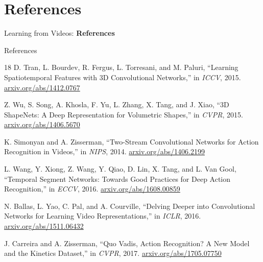 \section{References}
\begin{frame}{}
    \LARGE Learning from Videos: \textbf{References}
\end{frame}

\begin{frame}[allowframebreaks]{References}
    \small
    \begin{thebibliography}{18}
        D. Tran, L. Bourdev, R. Fergus, L. Torresani, and M. Paluri,
        \newblock ``Learning Spatiotemporal Features with 3D Convolutional Networks,''
        \newblock in \emph{ICCV}, 2015.
        \newblock \href{https://arxiv.org/abs/1412.0767}{arxiv.org/abs/1412.0767}

        Z. Wu, S. Song, A. Khosla, F. Yu, L. Zhang, X. Tang, and J. Xiao,
        \newblock ``3D ShapeNets: A Deep Representation for Volumetric Shapes,''
        \newblock in \emph{CVPR}, 2015.
        \newblock \href{https://arxiv.org/abs/1406.5670}{arxiv.org/abs/1406.5670}

        K. Simonyan and A. Zisserman,
        \newblock ``Two-Stream Convolutional Networks for Action Recognition in Videos,''
        \newblock in \emph{NIPS}, 2014.
        \newblock \href{https://arxiv.org/abs/1406.2199}{arxiv.org/abs/1406.2199}

        L. Wang, Y. Xiong, Z. Wang, Y. Qiao, D. Lin, X. Tang, and L. Van Gool,
        \newblock ``Temporal Segment Networks: Towards Good Practices for Deep Action Recognition,''
        \newblock in \emph{ECCV}, 2016.
        \newblock \href{https://arxiv.org/abs/1608.00859}{arxiv.org/abs/1608.00859}

        N. Ballas, L. Yao, C. Pal, and A. Courville,
        \newblock ``Delving Deeper into Convolutional Networks for Learning Video Representations,''
        \newblock in \emph{ICLR}, 2016.
        \newblock \href{https://arxiv.org/abs/1511.06432}{arxiv.org/abs/1511.06432}

        J. Carreira and A. Zisserman,
        \newblock ``Quo Vadis, Action Recognition? A New Model and the Kinetics Dataset,''
        \newblock in \emph{CVPR}, 2017.
        \newblock \href{https://arxiv.org/abs/1705.07750}{arxiv.org/abs/1705.07750}


\end{thebibliography}
\end{frame}
